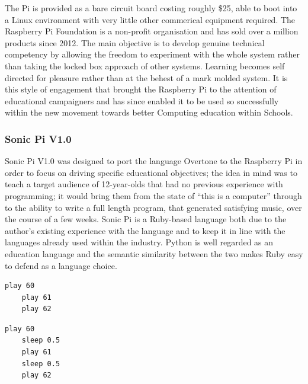 \documentclass[11pt, abstracton, twoside, titlepage=true]{scrartcl}
\begin{document}
The Pi is provided as a bare circuit board costing roughly \$25, able to boot 
into a Linux environment with very little other commerical equipment required. 
The Raspberry Pi Foundation is a non-profit organisation and has sold over a 
million products since 2012. The main objective is to develop genuine 
technical competency by allowing the freedom to experiment with the whole 
system rather than taking the locked box approach of other systems. Learning 
becomes self directed for pleasure rather than at the behest of a mark molded 
system. It is this style of engagement that brought the Raspberry Pi to the 
attention of educational campaigners and has since enabled it to be used so 
successfully within the new movement towards better Computing education within 
Schools. 

\subsubsection{Sonic Pi V1.0}

\begin{multicols}{2}
Sonic Pi V1.0 was designed to port the language Overtone to the Raspberry Pi in 
order to focus on driving specific educational objectives; the idea in mind was 
to teach a target audience of 12-year-olds that had no previous experience with 
programming; it would bring them from the state of ``this is a computer'' through 
to the ability to write a full length program, that generated satisfying music, 
over the course of a few weeks. Sonic Pi is a Ruby-based language both due to 
the author's existing experience with the language and to keep it in line with 
the languages already used within the industry. Python is well regarded as an 
education language and the semantic similarity between the two makes Ruby easy 
to defend as a language choice.
\\

\begin{minipage}{0.5\textwidth}
	\begin{minipage}[t]{\textwidth}
		\begin{lstlisting}[style = sonicpi]
	play 60
	play 61
	play 62
		\end{lstlisting}
	\end{minipage}

	\begin{minipage}[t]{\textwidth}
		\begin{lstlisting}[style = sonicpi]
	play 60
	sleep 0.5
	play 61
	sleep 0.5
	play 62
		\end{lstlisting}
	\end{minipage}
\end{minipage}

\end{multicols}
\end{document}
